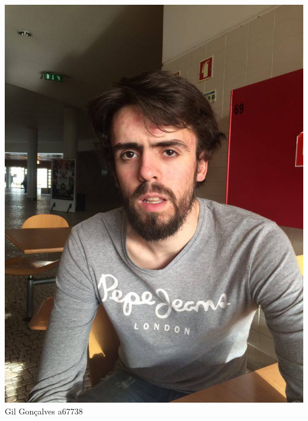 \begin{titlepage}
\begin{center}
\begin{minipage}[b]{.1\textwidth}
	\includegraphics[scale=0.1002]{gil}
	\small{Gil Gonçalves a67738}
\end{minipage}
\hfill
\begin{minipage}[b]{.1\textwidth}

\end{minipage}
\end{center}
\end{titlepage}
